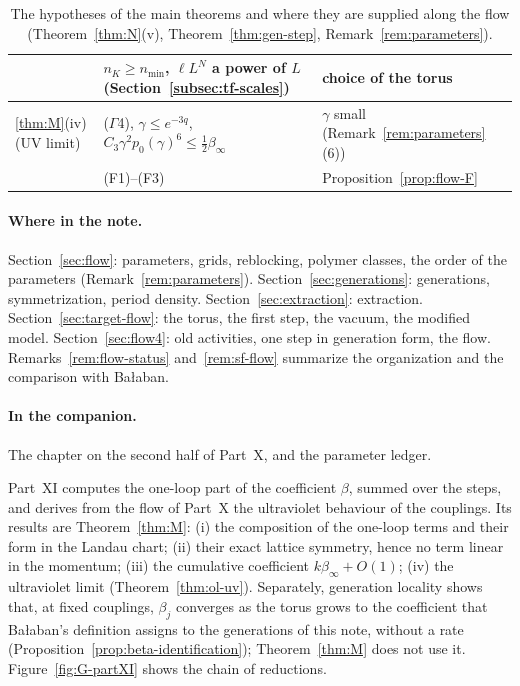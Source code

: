 \begin{table}[htbp]
\begin{tabular}{@{}p{}p{}p{}@{}}
 & \raggedright $n_K\ge n_{\min}$, $\ell L^N$ a power of $L$ (Section~\ref{subsec:tf-scales}) & \raggedright choice of the torus \tabularnewline
\hline
\raggedright \ref{thm:M}(iv) (UV limit) & \raggedright ($\Gamma$4), $\gamma\le e^{-3q}$, $C_3\gamma^2p_0(\gamma)^6\le\frac12\beta_\infty$ & \raggedright $\gamma$ small (Remark~\ref{rem:parameters}(6)) \tabularnewline
 & \raggedright (F1)--(F3) & \raggedright Proposition~\ref{prop:flow-F} \tabularnewline
\hline
\end{tabular}
\caption{The hypotheses of the main theorems and where they are supplied along the flow (Theorem~\ref{thm:N}(v), Theorem~\ref{thm:gen-step}, Remark~\ref{rem:parameters}).}\label{tab:G-supply}
\end{table}

\paragraph{Where in the note.} Section~\ref{sec:flow}: parameters, grids, reblocking, polymer classes, the order of the parameters (Remark~\ref{rem:parameters}). Section~\ref{sec:generations}: generations, symmetrization, period density. Section~\ref{sec:extraction}: extraction. Section~\ref{sec:target-flow}: the torus, the first step, the vacuum, the modified model. Section~\ref{sec:flow4}: old activities, one step in generation form, the flow. Remarks~\ref{rem:flow-status} and~\ref{rem:sf-flow} summarize the organization and the comparison with Ba\l aban.

\paragraph{In the companion.} The chapter on the second half of Part~X, and the parameter ledger.

\label{g:oneloop}

Part~XI computes the one-loop part of the coefficient $\beta$, summed over the steps, and derives from the flow of Part~X the ultraviolet behaviour of the couplings. Its results are Theorem~\ref{thm:M}: (i) the composition of the one-loop terms and their form in the Landau chart; (ii) their exact lattice symmetry, hence no term linear in the momentum; (iii) the cumulative coefficient $k\beta_\infty+O(1)$; (iv) the ultraviolet limit (Theorem~\ref{thm:ol-uv}). Separately, generation locality shows that, at fixed couplings, $\beta_j$ converges as the torus grows to the coefficient that Ba\l aban's definition assigns to the generations of this note, without a rate (Proposition~\ref{prop:beta-identification}); Theorem~\ref{thm:M} does not use it. Figure~\ref{fig:G-partXI} shows the chain of reductions.

